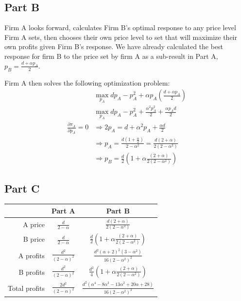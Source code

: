 \documentclass[11pt]{article} %
\begin{document}
\subsection{Part B}
Firm A looks forward, calculates Firm B's optimal response to any price level Firm A sets, then chooses their own price level to set that will maximize their own profits given Firm B's response.  We have already calculated the best response for firm B to the price set by firm A as a sub-result in Part A, $p_B =  \frac{d + \alpha p_A}{2}$. 

Firm A then solves the following optimization problem:
\begin{align*}
&\max_{p_A} dp_A - p_A^2 + \alpha p_A\left(  \frac{d + \alpha p_A}{2}\right)\\
&\max_{p_A} dp_A - p_A^2 + \frac{\alpha^2 p_A^2}{2} + \frac{\alpha p_A d}{2}\\
\frac{\partial \pi_A}{\partial p_A} =0 &\Rightarrow 2 p_A = d + \alpha^2 p_A + \frac{\alpha d}{2}\\
&\Rightarrow p_A = \frac{d\left(1 + \frac{\alpha }{2}\right)}{2 - \alpha^2} = \frac{d(2+\alpha)}{2(2-\alpha^2)}\\
&\Rightarrow p_B = \frac{d}{2}\left(1 + \alpha \frac{(2+\alpha)}{2(2-\alpha^2)} \right)%
\end{align*}
\subsection{Part C}

\begin{center}
\begin{tabular}{r | c c}
& Part A & Part B \\
\hline
A price & $\frac{d}{2-\alpha}$ & $\frac{d(2+\alpha)}{2(2-\alpha^2)}$ \\
B price & $\frac{d}{2-\alpha}$ & $\frac{d}{2}\left(1 + \alpha \frac{(2+\alpha)}{2(2-\alpha^2)} \right)$ \\
A profits & $\frac{d^2}{(2-\alpha)^2} $ & $\frac{d^2(\alpha+2)^2(3-\alpha^2)}{16 (2 - \alpha^2)^2}$ \\
B profits & $\frac{d^2}{(2-\alpha)^2}$ & $\frac{d^2}{4}\left(1 + \alpha \frac{(2+\alpha)}{2(2-\alpha^2)} \right)$ \\
Total profits &$\frac{2d^2}{(2-\alpha)^2}$ &$ \frac{d^2(\alpha^4 - 8\alpha^3 - 13\alpha^2 +20\alpha + 28)}{16(2 - \alpha^2)^2}$
\end{tabular}
\end{center}
\end{document}
